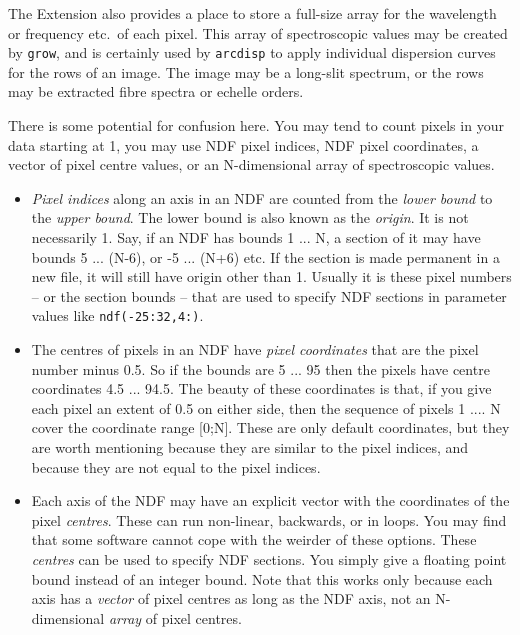    The Extension also provides a place to store a full-size array for
   the wavelength or frequency etc.\ of each pixel.  This array of
   spectroscopic values may be created by {\tt grow}, and is certainly
   used by {\tt arcdisp} to apply individual dispersion curves for the
   rows of an image. The image may be a long-slit spectrum, or the rows
   may be extracted fibre spectra or echelle orders.

   There is some potential for confusion here.  You may tend to count
   pixels in your data starting at 1, you may use NDF pixel indices, NDF
   pixel coordinates, a vector of pixel centre values, or an
   N-dimensional array of spectroscopic values.

\begin{itemize}
\item {\it Pixel indices} along an axis in an NDF are counted from the
   {\it lower bound} to the {\it upper bound}.  The lower bound is also
   known as the {\it origin}.  It is not necessarily 1.  Say, if an NDF
   has bounds 1 ... N, a section of it may have bounds 5 ... (N-6), or
   -5 ... (N+6) etc.  If the section is made permanent in a new file, it
   will still have origin other than 1.  Usually it is these pixel
   numbers -- or the section bounds -- that are used to specify NDF
   sections in parameter values like {\tt ndf(-25:32,4:)}.

\item The centres of pixels in an NDF have {\it pixel coordinates} that
   are the pixel number minus 0.5.  So if the bounds are 5 ... 95 then
   the pixels have centre coordinates 4.5 ... 94.5.  The beauty of
   these coordinates is that, if you give each pixel an extent of
   0.5 on either side, then the sequence of pixels 1 .... N cover the
   coordinate range [0;N].  These are only default coordinates, but
   they are worth mentioning because they are similar to the pixel
   indices, and because they are not equal to the pixel indices.

\item Each axis of the NDF may have an explicit vector with the
   coordinates of the pixel {\it centres}.  These can run non-linear,
   backwards, or in loops.  You may find that some software cannot cope
   with the weirder of these options.  These {\it centres} can be used
   to specify NDF sections.  You simply give a floating point bound
   instead of an integer bound.  Note that this works only because each
   axis has a {\it vector} of pixel centres as long as the NDF axis, not
   an N-dimensional {\it array} of pixel centres.


\end{itemize}
